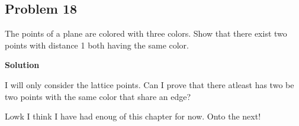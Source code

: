 \documentclass{article}
\begin{document}
\subsection{Problem 18}

The points of a plane are colored with three colors. Show that there exist two points
with distance 1 both having the same color.

\textbf{Solution}

I will only consider the lattice points. Can I prove that there atleast has 
two be two points with the same color that share an edge?



Lowk I think I have had enoug of this chapter for now. Onto the next!
\end{document}
